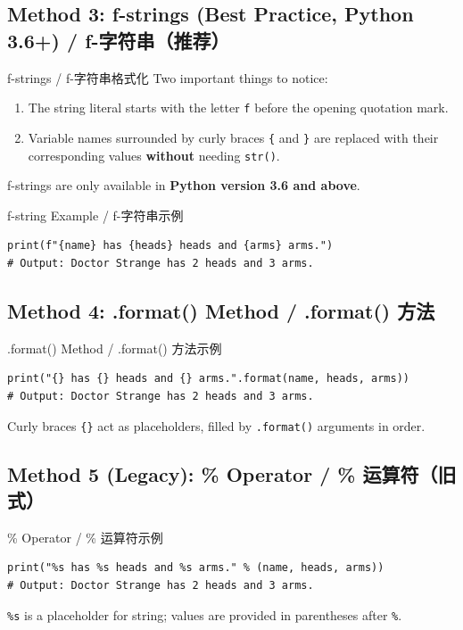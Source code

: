 \documentclass[11pt,a4paper]{report}
\let\oldtexttt\texttt
\renewcommand{\texttt}[1]{\textcolor{mainblue}{\oldtexttt{#1}}}
\begin{document}
\subsection{Method 3: f-strings (Best Practice, Python 3.6+) / f-字符串（推荐）}

\begin{concept}{f-strings / f-字符串格式化}
    Two important things to notice:
    \begin{enumerate}
        \item The string literal starts with the letter \texttt{f} before the opening quotation mark.
        \item Variable names surrounded by curly braces \texttt{\{} and \texttt{\}} are replaced with their corresponding values \textbf{without} needing \texttt{str()}.
    \end{enumerate}
    f-strings are only available in \textbf{Python version 3.6 and above}.
\end{concept}

\begin{examplebox}{f-string Example / f-字符串示例}
\begin{lstlisting}
print(f"{name} has {heads} heads and {arms} arms.")
# Output: Doctor Strange has 2 heads and 3 arms.
\end{lstlisting}
\end{examplebox}

\subsection{Method 4: .format() Method / .format() 方法}

\begin{examplebox}{.format() Method / .format() 方法示例}
\begin{lstlisting}
print("{} has {} heads and {} arms.".format(name, heads, arms))
# Output: Doctor Strange has 2 heads and 3 arms.
\end{lstlisting}
    Curly braces \texttt{\{\}} act as placeholders, filled by \texttt{.format()} arguments in order.
\end{examplebox}

\subsection{Method 5 (Legacy): \% Operator / \% 运算符（旧式）}

\begin{examplebox}{\% Operator / \% 运算符示例}
\begin{lstlisting}
print("%s has %s heads and %s arms." % (name, heads, arms))
# Output: Doctor Strange has 2 heads and 3 arms.
\end{lstlisting}
    \texttt{\%s} is a placeholder for string; values are provided in parentheses after \texttt{\%}.
\end{examplebox}
\end{document}
